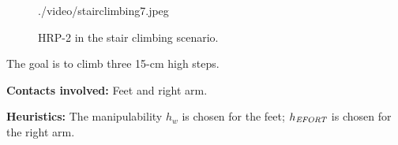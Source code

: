 \documentclass[journal]{IEEEtran}
\providecommand{\DIFaddtex}[1]{#1} %
\providecommand{\DIFadd}[1]{\texorpdfstring{\DIFaddtex{#1}}{#1}} %
\begin{document}
\begin{figure}[h!t!]
\begin{center}
    {./video/stairclimbing7.jpeg}
  \caption{
           HRP-2 in the stair climbing scenario. }
		   \label{fig:stair_robust}
  \end{center}
  \vspace{-0.5cm}
\end{figure}


\DIFadd{The goal is to climb three 15-cm high steps.
}

\noindent\DIFadd{\textbf{Contacts involved:} Feet and right arm.
}

\noindent\DIFadd{\textbf{Heuristics:} The manipulability $h_w$ is chosen for the feet; $h_{\textrm{\it EFORT}}$ is chosen for the right arm.
}

\end{document}

